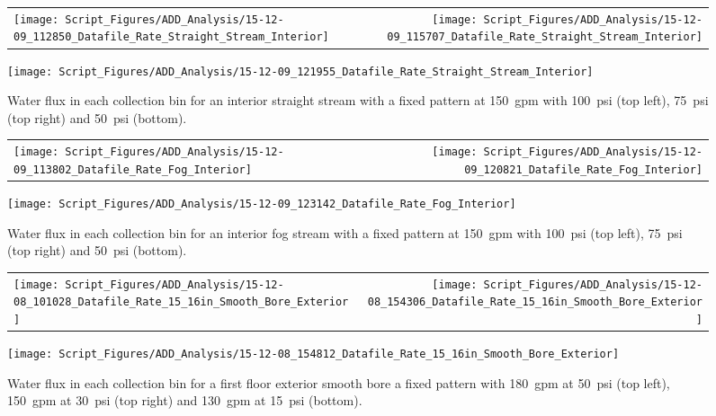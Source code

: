 \documentclass[12pt,oneside]{book}
\begin{document}
\begin{figure}[ht]
\begin{tabular*}{\textwidth}{lr}
\texttt{[image: Script\_Figures/ADD\_Analysis/15-12-09\_112850\_Datafile\_Rate\_Straight\_Stream\_Interior]} &
\texttt{[image: Script\_Figures/ADD\_Analysis/15-12-09\_115707\_Datafile\_Rate\_Straight\_Stream\_Interior]} \\
\end{tabular*}
\centering
\texttt{[image: Script\_Figures/ADD\_Analysis/15-12-09\_121955\_Datafile\_Rate\_Straight\_Stream\_Interior]}
\caption[Water Flux Varying Pressure with Straight Stream]{Water flux in each collection bin for an interior straight stream with a fixed pattern at 150~gpm with 100~psi (top left), 75~psi (top right) and 50~psi (bottom).}
\label{fig:Interior_Varying_Nozzle_Pressure_SS_Fixed_Pattern}
\end{figure}

\begin{figure}[ht]
\begin{tabular*}{\textwidth}{lr}
\texttt{[image: Script\_Figures/ADD\_Analysis/15-12-09\_113802\_Datafile\_Rate\_Fog\_Interior]} &
\texttt{[image: Script\_Figures/ADD\_Analysis/15-12-09\_120821\_Datafile\_Rate\_Fog\_Interior]} \\
\end{tabular*}
\centering
\texttt{[image: Script\_Figures/ADD\_Analysis/15-12-09\_123142\_Datafile\_Rate\_Fog\_Interior]}
\caption[Water Flux Varying Pressure with Fog Stream]{Water flux in each collection bin for an interior fog stream with a fixed pattern at 150~gpm with 100~psi (top left), 75~psi (top right) and 50~psi (bottom).}
\label{fig:Interior_Varying_Nozzle_Pressure_Fog_Fixed_Pattern}
\end{figure}

\begin{figure}[ht]
\begin{tabular*}{\textwidth}{lr}
\texttt{[image: Script\_Figures/ADD\_Analysis/15-12-08\_101028\_Datafile\_Rate\_15\_16in\_Smooth\_Bore\_Exterior]} &
\texttt{[image: Script\_Figures/ADD\_Analysis/15-12-08\_154306\_Datafile\_Rate\_15\_16in\_Smooth\_Bore\_Exterior]} \\
\end{tabular*}
\centering
\texttt{[image: Script\_Figures/ADD\_Analysis/15-12-08\_154812\_Datafile\_Rate\_15\_16in\_Smooth\_Bore\_Exterior]}
\caption[Water Flux Varying Pressure with Smooth Bore Stream]{Water flux in each collection bin for a first floor exterior smooth bore a fixed pattern with 180~gpm at 50~psi (top left), 150~gpm at 30~psi (top right) and 130~gpm at 15~psi (bottom).}
\label{fig:Exterior_First_Floor_Varying_Nozzle_Pressure_SB_Fixed_Pattern}
\end{figure}
\end{document}
